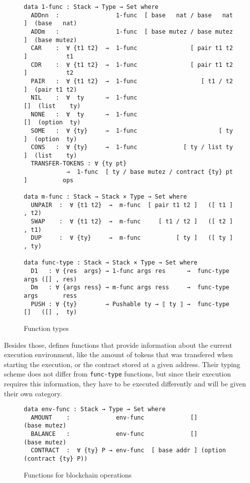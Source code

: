 \begin{figure}[tp]
\begin{verbatim}
data 1-func : Stack → Type → Set where
  ADDnn  :                1-func  [ base   nat / base   nat ]  (base   nat)
  ADDm   :                1-func  [ base mutez / base mutez ]  (base mutez)
  CAR    :  ∀ {t1 t2}  →  1-func               [ pair t1 t2 ]           t1
  CDR    :  ∀ {t1 t2}  →  1-func               [ pair t1 t2 ]           t2
  PAIR   :  ∀ {t1 t2}  →  1-func                  [ t1 / t2 ]  (pair t1 t2)
  NIL    :  ∀  ty      →  1-func                           []  (list    ty)
  NONE   :  ∀  ty      →  1-func                           []  (option  ty)
  SOME   :  ∀ {ty}     →  1-func                       [ ty ]  (option  ty)
  CONS   :  ∀ {ty}     →  1-func             [ ty / list ty ]  (list    ty)
  TRANSFER-TOKENS : ∀ {ty pt}
            →  1-func  [ ty / base mutez / contract {ty} pt ]          ops

data m-func : Stack → Stack × Type → Set where
  UNPAIR  :  ∀ {t1 t2}  →  m-func  [ pair t1 t2 ]   ([ t1 ] , t2)
  SWAP    :  ∀ {t1 t2}  →  m-func     [ t1 / t2 ]   ([ t2 ] , t1)
  DUP     :  ∀ {ty}     →  m-func          [ ty ]   ([ ty ] , ty)

data func-type : Stack → Stack × Type → Set where
  D1   : ∀ {res  args} → 1-func args res      →  func-type args ([] , res)
  Dm   : ∀ {args ress} → m-func args ress     →  func-type args       ress
  PUSH : ∀ {ty}        → Pushable ty → ⟦ ty ⟧ →  func-type []   ([] ,  ty)
\end{verbatim}
\caption{Function types}
\label{func-type}
\end{figure}

Besides those,  defines functions that provide information about the
current execution environment,
like the amount of tokens that was transfered when starting the execution,
or the contract stored at a given address.
Their typing scheme does not differ from \verb/func-type/ functions,
but since their execution requires this information,
they have to be executed differently and will be given their own category.

\begin{figure}[tp]
\begin{verbatim}
data env-func : Stack → Type → Set where
  AMOUNT    :             env-func             []               (base mutez)
  BALANCE   :             env-func             []               (base mutez)
  CONTRACT  :  ∀ {ty} P → env-func  [ base addr ] (option (contract {ty} P))
\end{verbatim}
\caption{Functions for blockchain operations}
\label{env-func}
\end{figure}

